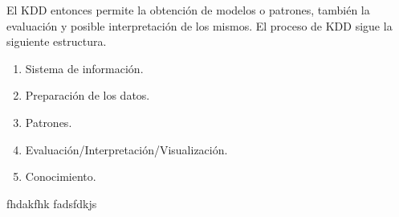 \documentclass{article}
\begin{document}
El KDD entonces permite la obtención de modelos o patrones, también la evaluación y posible interpretación de los mismos. El proceso de KDD sigue la siguiente
estructura.

\begin{enumerate}
  \item Sistema de información.
  \item Preparación de los datos.
  \item Patrones.
  \item Evaluación/Interpretación/Visualización.
  \item Conocimiento.
\end{enumerate}


fhdakfhk fadsfdkjs
\end{document}
